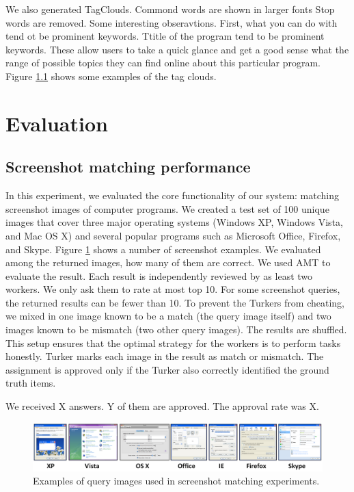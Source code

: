 \documentclass{www2010-submission}
\begin{document}
We also generated TagClouds. Commond words are shown in larger fonts
Stop words are removed. Some interesting obseravtions. First, what you
can do with tend ot be prominent keywords. Ttitle of the program tend
to be prominent keywords. These allow users to take a quick glance and
get a good sense what the range of possible topics they can find
online about this particular program. Figure \ref{} shows some
examples of the tag clouds.

\section{Evaluation}


\subsection{Screenshot matching performance}

In this experiment, we evaluated the core functionality of our system:
matching screenshot images of computer programs. We created a test set
of 100 unique images that cover three major operating systems (Windows
XP, Windows Vista, and Mac OS X) and several popular programs such as
Microsoft Office, Firefox, and Skype. Figure \ref{fig:query_examples}
shows a number of screenshot examples.  We evaluated among the
returned images, how many of them are correct. We used AMT to evaluate
the result. Each result is independently reviewed by as least two
workers. We only ask them to rate at most top 10. For some screenshot
queries, the returned results can be fewer than 10. To prevent the
Turkers from cheating, we mixed in one image known to be a match (the
query image itself) and two images known to be mismatch (two other
query images). The results are shuffled. This setup ensures that the
optimal strategy for the workers is to perform tasks honestly. Turker
marks each image in the result as match or mismatch. The assignment is
approved only if the Turker also correctly identified the ground truth
items.

We received X answers. Y of them are approved. The approval rate
was X.

\begin{figure}
\includegraphics[width=2\columnwidth]{figure/query_examples.png}
\caption{Examples of query images used in screenshot matching
experiments.}
\label{fig:query_examples}
\end{figure}
\end{document}
